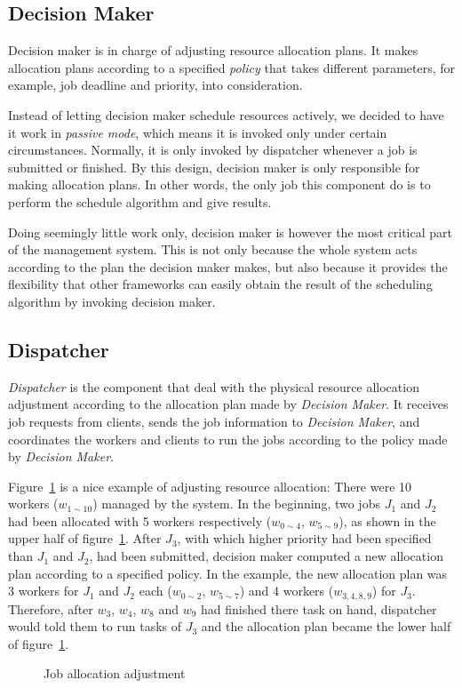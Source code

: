 \subsection{Decision Maker}	%

Decision maker is in charge of adjusting resource allocation plans.
It makes allocation plans according to a specified \emph{policy} that
takes different parameters, for example, job deadline and priority, into
consideration. 

Instead of letting decision maker schedule resources actively, we
decided to have it work in \emph{passive mode}, which means it is
invoked only under certain circumstances.
Normally, it is only invoked by dispatcher whenever a job is submitted
or finished.
By this design, decision maker is only responsible for making allocation
plans.
In other words, the only job this component do is to perform the
schedule algorithm and give results.

Doing seemingly little work only, decision maker is however the most
critical part of the management system.
This is not only because the whole system acts according to the plan the
decision maker makes, but also because it provides the flexibility that
other frameworks can easily obtain the result of the scheduling
algorithm by invoking decision maker.

\subsection{Dispatcher}	%

\emph{Dispatcher} is the component that deal with the physical resource
allocation adjustment according to the allocation plan made by
\emph{Decision Maker}.
It receives job requests from clients, sends the job information to
\emph{Decision Maker}, and coordinates the workers and clients to run
the jobs according to the policy made by \emph{Decision Maker}.

Figure~\ref{fig:allocation-adjustment} is a nice example of adjusting
resource allocation: There were 10 workers ($w_{1\sim10}$) managed by
the system.
In the beginning, two jobs $J_1$ and $J_2$ had been allocated with 5
workers respectively ($w_{0\sim4}$, $w_{5\sim9}$), as shown in the upper
half of figure~\ref{fig:allocation-adjustment}.
After $J_3$, with which higher priority had been specified than $J_1$
and $J_2$, had been submitted, decision maker computed a new allocation
plan according to a specified policy.
In the example, the new allocation plan was 3 workers for $J_1$ and
$J_2$ each ($w_{0\sim2}$, $w_{5\sim7}$) and 4 workers ($w_{3,4,8,9}$)
for $J_3$.
Therefore, after $w_3$, $w_4$, $w_8$ and $ w_9$ had finished there task
on hand, dispatcher would told them to run tasks of $J_3$ and the
allocation plan became the lower half of
figure~\ref{fig:allocation-adjustment}.

\begin{figure}
  \centering
  
  \caption{Job allocation adjustment}
  \label{fig:allocation-adjustment}
\end{figure}
